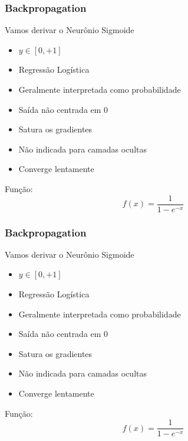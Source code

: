 \documentclass{beamer}
\begin{document}
\begin{frame}
	\frametitle{Backpropagation}
	\begin{block}{Vamos derivar o Neurônio Sigmoide}
		\begin{itemize}
			\item $y \in [0, + 1]$
			\item Regressão Logística
			\item Geralmente interpretada como probabilidade
			\item Saída não centrada em $0$
			\item Satura os gradientes
			\item Não indicada para camadas ocultas
			\item Converge lentamente
		\end{itemize}
		Função:
		$$f(x) = \frac{1}{1-e^{-x}}$$
	\end{block}
\end{frame}
\begin{frame}
	\frametitle{Backpropagation}
	\begin{block}{Vamos derivar o Neurônio Sigmoide}
		\begin{itemize}
			\item $y \in [0, + 1]$
			\item Regressão Logística
			\item Geralmente interpretada como probabilidade
			\item Saída não centrada em $0$
			\item Satura os gradientes
			\item Não indicada para camadas ocultas
			\item Converge lentamente
		\end{itemize}
		Função:
		$$f(x) = \frac{1}{1-e^{-x}}$$
	\end{block}
\end{frame}
\end{document}
